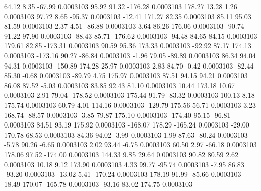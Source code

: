        64.12        8.35      -67.99     0.0003103
       95.92       91.32     -176.28     0.0003103
      178.27       13.28        1.26     0.0003103
       97.72        8.65      -95.37     0.0003103
      -12.41      171.27       82.35     0.0003103
       85.11       95.03       81.59     0.0003103
        2.37        4.51      -86.88     0.0003103
        3.64       86.26      176.06     0.0003103
      -90.74       91.22       97.90     0.0003103
      -88.43       85.71     -176.62     0.0003103
      -94.48       84.65       84.15     0.0003103
      179.61       82.85     -173.31     0.0003103
       90.59       95.36      173.33     0.0003103
      -92.92       87.17      174.13     0.0003103
     -173.16       90.27      -86.84     0.0003103
       -1.96       79.05      -89.89     0.0003103
       86.34       94.04       94.31     0.0003103
     -150.89      174.28       25.97     0.0003103
        2.83       84.70       -0.42     0.0003103
      -82.44       85.30       -0.68     0.0003103
      -89.79        4.75      175.97     0.0003103
       87.51       94.15       94.21     0.0003103
       86.08       87.52       -5.03     0.0003103
       83.85       92.43       81.10     0.0003103
       10.44      173.18       10.67     0.0003103
        2.91       79.04     -178.52     0.0003103
      175.44       91.79      -83.32     0.0003103
      100.13        8.18      175.74     0.0003103
       60.79        4.01      114.16     0.0003103
     -129.79      175.56       56.71     0.0003103
        3.23      168.74      -88.57     0.0003103
       -3.85       79.87      175.10     0.0003103
     -174.40       95.15      -96.81     0.0003103
       84.51       93.19      175.92     0.0003103
     -168.07      178.29     -165.24     0.0003103
      -29.00      170.78       68.53     0.0003103
       84.36       94.02       -3.99     0.0003103
        1.99       87.63      -80.24     0.0003103
       -5.78       90.26       -6.65     0.0003103
        2.02       93.44       -6.75     0.0003103
       60.50        2.97      -66.18     0.0003103
      178.06       97.52     -174.00     0.0003103
      144.33        9.85       29.64     0.0003103
       90.82       80.59        2.62     0.0003103
       10.18        9.12      173.90     0.0003103
        4.33       99.77      -95.74     0.0003103
       -7.95       86.83      -93.20     0.0003103
      -13.02        5.41     -170.24     0.0003103
      178.19       91.99      -85.66     0.0003103
       18.49      170.07     -165.78     0.0003103
      -93.16       83.02      174.75     0.0003103
